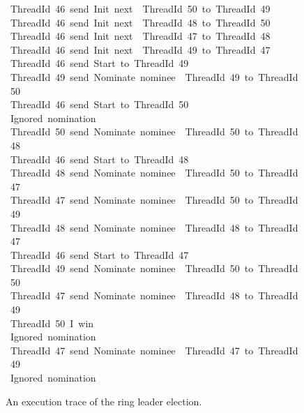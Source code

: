 \documentclass[sigplan,screen]{acmart}
\begin{document}
\begin{figure}
\raggedright
\scriptsize

\begin{tabbing}\ttfamily
~ThreadId~46~send~Init~next~~ThreadId~50~to~ThreadId~49\\
\ttfamily ~ThreadId~46~send~Init~next~~ThreadId~48~to~ThreadId~50\\
\ttfamily ~ThreadId~46~send~Init~next~~ThreadId~47~to~ThreadId~48\\
\ttfamily ~ThreadId~46~send~Init~next~~ThreadId~49~to~ThreadId~47\\
\ttfamily ~ThreadId~46~send~Start~to~ThreadId~49\\
\ttfamily ~ThreadId~49~send~Nominate~nominee~~ThreadId~49~to~ThreadId~50\\
\ttfamily ~ThreadId~46~send~Start~to~ThreadId~50\\
\ttfamily ~Ignored~nomination\\
\ttfamily ~ThreadId~50~send~Nominate~nominee~~ThreadId~50~to~ThreadId~48\\
\ttfamily ~ThreadId~46~send~Start~to~ThreadId~48\\
\ttfamily ~ThreadId~48~send~Nominate~nominee~~ThreadId~50~to~ThreadId~47\\
\ttfamily ~ThreadId~47~send~Nominate~nominee~~ThreadId~50~to~ThreadId~49\\
\ttfamily ~ThreadId~48~send~Nominate~nominee~~ThreadId~48~to~ThreadId~47\\
\ttfamily ~ThreadId~46~send~Start~to~ThreadId~47\\
\ttfamily ~ThreadId~49~send~Nominate~nominee~~ThreadId~50~to~ThreadId~50\\
\ttfamily ~ThreadId~47~send~Nominate~nominee~~ThreadId~48~to~ThreadId~49\\
\ttfamily ~ThreadId~50~I~win\\
\ttfamily ~Ignored~nomination\\
\ttfamily ~ThreadId~47~send~Nominate~nominee~~ThreadId~47~to~ThreadId~49\\
\ttfamily ~Ignored~nomination
\end{tabbing}

\normalsize
\caption{An execution trace of the ring leader election.}
\label{fig:main1-trace}
\end{figure}
\end{document}
